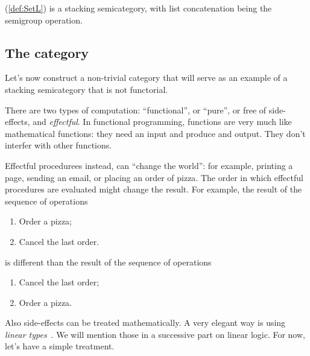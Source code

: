 \begin{example}
	\SetL (\cref{def:SetL}) is a stacking semicategory,
	with list concatenation being the semigroup operation.
\end{example}

\subsection{The \Effects category}

Let's now construct a non-trivial category that will serve as an example of a stacking semicategory that is not functorial.

There are two types of computation: ``functional'', or ``pure'', or free of side-effects, and \emph{effectful}.
In functional programming, functions are very much like mathematical functions: they need an input and produce and output.
They don't interfer with other functions.

Effectful procedurees instead, can ``change the world'': for example, printing a page, sending an email, or placing an order of pizza.
The order in which effectful procedures are evaluated might change the result.
For example, the result of the sequence of operations
%
\begin{enumerate}
	\item Order a pizza;
	\item Cancel the last order.
\end{enumerate}
%
is different than the result of the sequence of operations
%
\begin{enumerate}
	\item Cancel the last order;
	\item Order a pizza.
\end{enumerate}

Also side-effects can be treated mathematically.
A very elegant way is using \emph{linear types}~\cite{Wadler90lineartypes}.
We will mention those in a successive part on linear logic.
For now, let's have a simple treatment.

\begin{marginfigure}
	\centering
	\\
	\caption{}
	\label{fig:effects12}
\end{marginfigure}

